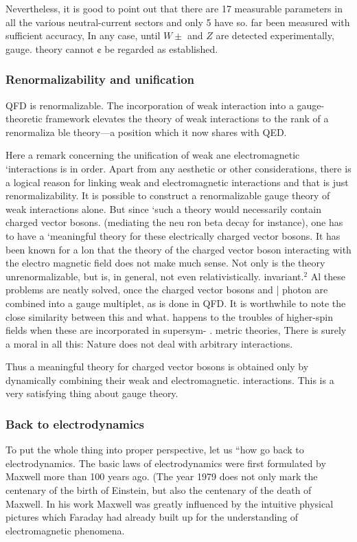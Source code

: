 Nevertheless, it is good to point out that there are 17 measurable
parameters in all the various neutral-current sectors and only 5 have so.
far been measured with sufficient accuracy, In any case, until $W\pm$ and
$Z$ are detected experimentally, gauge. theory cannot ¢ be regarded as
established. 

\subsubsection*{Renormalizability and unification}

QFD is renormalizable. The incorporation of weak interaction into
a gauge-theoretic framework elevates the theory of weak interactions to
the rank of a renormaliza ble theory—a position which it now shares with
QED. 

Here a remark concerning the unification of weak ane electromagnetic
‘interactions is in order. Apart from any aesthetic or other considerations,
there is a logical reason for linking weak and electromagnetic interactions
and that is just renormalizability. It is possible to construct a renormalizable gauge theory of weak interactions alone. But since ‘such a theory
would necessarily contain charged vector bosons. (mediating the neu ron
beta decay for instance), one has to have a ‘meaningful theory for these
electrically charged vector bosons. It has been known for a lon
that the theory of the charged vector boson interacting with the electro
magnetic field does not make much sense. Not only is the theory unrenormalizable, but is, in general, not even relativistically. invariant.$^{2}$ Al
these problems are neatly solved, once the charged vector bosons and |
photon are combined into a gauge multiplet, as is done in QFD. It is
worthwhile to note the close similarity between this and what. happens to
the troubles of higher-spin fields when these are incorporated in supersym-
. metric theories, There is surely a moral in all this: Nature does not deal
with arbitrary interactions. 


Thus a meaningful theory for charged vector bosons is obtained only
by dynamically combining their weak and electromagnetic. interactions.
This is a very satisfying thing about gauge theory. 

\subsubsection{Back to electrodynamics}

To put the whole thing into proper perspective, let us “how go back to electrodynamics. The basic laws of electrodynamics were first formulated by Maxwell more than 100 years ago. (The year 1979 does not only mark the centenary of the birth of Einstein, but also the centenary of the death of Maxwell. In his work Maxwell was greatly influenced by the intuitive physical pictures which Faraday had already built up for the understanding of electromagnetic phenomena. 

